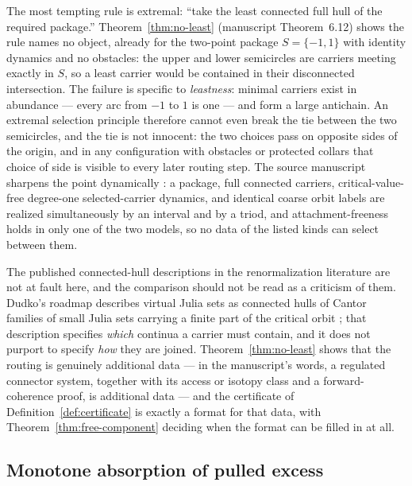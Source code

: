 \documentclass[11pt,reqno]{amsart}
\theoremstyle{definition}
\theoremstyle{remark}
\begin{document}
The most tempting rule is extremal: ``take the least connected full hull
of the required package.''  Theorem~\ref{thm:no-least} (manuscript
Theorem~6.12) shows the rule names no object, already for the two-point
package $S=\{-1,1\}$ with identity dynamics and no obstacles: the upper
and lower semicircles are carriers meeting exactly in $S$, so a least
carrier would be contained in their disconnected intersection.  The
failure is specific to \emph{leastness}: minimal carriers exist in
abundance --- every arc from $-1$ to $1$ is one --- and form a large
antichain.  An extremal selection principle therefore cannot even break
the tie between the two semicircles, and the tie is not innocent: the two
choices pass on opposite sides of the origin, and in any configuration
with obstacles or protected collars that choice of side is visible to
every later routing step.  The source manuscript sharpens the point
dynamically \cite[Proposition~6.11]{MWman}: a package, full connected
carriers, critical-value-free degree-one selected-carrier dynamics, and
identical coarse orbit labels are realized simultaneously by an interval
and by a triod, and attachment-freeness holds in only one of the two
models, so no data of the listed kinds can select between them.

The published connected-hull descriptions in the renormalization
literature are not at fault here, and the comparison should not be read
as a criticism of them.  Dudko's roadmap describes virtual Julia sets as
connected hulls of Cantor families of small Julia sets carrying a finite
part of the critical orbit \cite{Dud25}; that description specifies
\emph{which} continua a carrier must contain, and it does not purport to
specify \emph{how} they are joined.  Theorem~\ref{thm:no-least} shows
that the routing is genuinely additional data --- in the manuscript's
words, a regulated connector system, together with its access or isotopy
class and a forward-coherence proof, is additional data \cite{MWman} ---
and the certificate of Definition~\ref{def:certificate} is exactly a
format for that data, with Theorem~\ref{thm:free-component} deciding when
the format can be filled in at all.

\subsection{Monotone absorption of pulled excess}
\label{subsec:A-comp-absorption}
\end{document}
